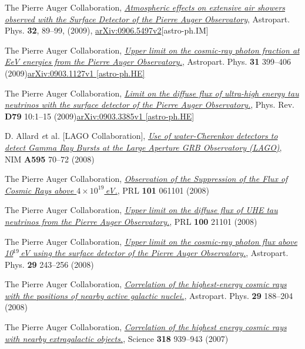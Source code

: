 \documentclass[11pt, a4paper]{article}
\newcommand{\years}[1]{\marginnote{\scriptsize #1}}
\begin{document}
\years{2009} The Pierre Auger Collaboration, \href{http://dx.doi.org/10.1016/j.astropartphys.2009.06.004}{\emph{Atmospheric effects on extensive air showers observed with the Surface Detector of the Pierre Auger Observatory}}, Astropart. Phys. {\bf 32}, 89--99, (2009), \href{http://arxiv.org/abs/0906.5497/}{arXiv:0906.5497v2}[astro-ph.IM]

\years{2009}The Pierre Auger Collaboration, \href{http://dx.doi.org/10.1016/j.astropartphys.2009.04.003}{\emph{Upper limit on the cosmic-ray photon fraction at EeV energies from the Pierre Auger Observatory.}}, Astropart. Phys. {\bf 31} 399--406 (2009)\href{http://arxiv.org/abs/0903.1127/}{arXiv:0903.1127v1 [astro-ph.HE]}

\years{2009}The Pierre Auger Collaboration, \href{http://dx.doi.org/10.1103/PhysRevD.79.102001}{\emph{Limit on the diffuse flux of ultra-high energy tau neutrinos with the surface detector of the Pierre Auger Observatory.}}, Phys. Rev. {\bf D79} 10:1--15 (2009)\href{http://arxiv.org/abs/0903.3385/}{arXiv:0903.3385v1 [astro-ph.HE]}

\years{2008}D. Allard {\emph et al.} [LAGO Collaboration], \href{http://dx.doi.org/10.1016/j.nima.2008.07.041}{\emph{Use of water-Cherenkov detectors to detect Gamma Ray Bursts at the Large Aperture GRB Observatory (LAGO)}}, NIM {\bf A595} 70--72 (2008)

\years{2008}The Pierre Auger Collaboration, \href{http://dx.doi.org/10.1103/PhysRevLett.101.061101}{\emph{Observation of the Suppression of the Flux of Cosmic Rays above $4\times10^{19}$\,eV.}}, PRL {\bf 101} 061101 (2008)

\years{2008}The Pierre Auger Collaboration, \href{http://dx.doi.org/10.1103/PhysRevLett.100.211101}{\emph{Upper limit on the diffuse flux of UHE tau neutrinos from the Pierre Auger Observatory.}}, PRL {\bf 100} 21101 (2008)


\years{2008}The Pierre Auger Collaboration, \href{http://dx.doi.org/10.1016/j.astropartphys.2008.01.003}{\emph{Upper limit on the cosmic-ray photon flux above 10$^{19}$\,eV using the surface detector of the Pierre Auger Observatory.}}, Astropart. Phys. {\bf 29} 243--256 (2008)

\years{2008}The Pierre Auger Collaboration, \href{http://dx.doi.org/10.1016/j.astropartphys.2008.01.002}{\emph{Correlation of the highest-energy cosmic rays with the positions of nearby active galactic nuclei.}}, Astropart. Phys. {\bf 29} 188--204 (2008)

\years{2007}The Pierre Auger Collaboration, \href{http://dx.doi.org/10.1126/science.1151124}{\emph{Correlation of the highest energy cosmic rays with nearby extragalactic objects.}}, Science {\bf 318} 939--943 (2007)
\end{document}
